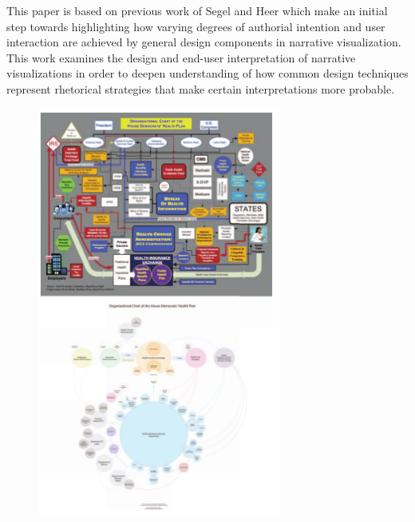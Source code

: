 \documentclass{egpubl}
\begin{document}
This paper is based on previous work of Segel and Heer \cite{Heer1} which make an initial step towards highlighting how varying degrees of authorial intention and user interaction are achieved by general design components in narrative visualization. This work examines the design and end-user interpretation of narrative visualizations in order to deepen understanding of how common design techniques represent rhetorical strategies that make certain interpretations more probable.
\begin{figure}
\begingroup
\centering
\includegraphics[width=8cm]{./images/vis_rhetoric}
\label{fig:vis_rhetoric}
\endgroup
\end{figure}
\end{document}
